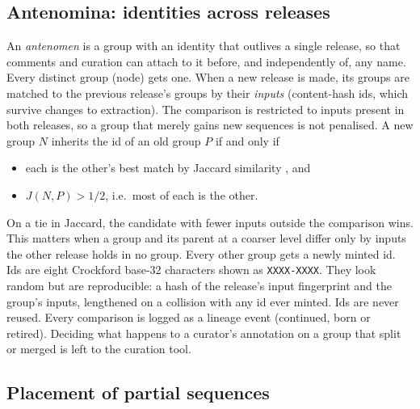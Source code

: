 \documentclass[11pt,a4paper]{article}
\begin{document}
\subsection{Antenomina: identities across releases}\label{sec:antenomina}

An \emph{antenomen} is a group with an identity that outlives a single release, so that comments
and curation can attach to it before, and independently of, any name. Every distinct group (node)
gets one. When a new release is made, its groups are matched to the previous release's groups by
their \emph{inputs} (content-hash ids, which survive changes to extraction). The comparison is
restricted to inputs present in both releases, so a group that merely gains new sequences is not
penalised. A new group $N$ inherits the id of an old group $P$ if and only if
\begin{itemize}
  \item each is the other's best match by Jaccard similarity \citep{jaccard1912}, and
  \item $J(N,P) > 1/2$, i.e.\ most of each is the other.
\end{itemize}
On a tie in Jaccard, the candidate with fewer inputs outside the comparison wins. This matters
when a group and its parent at a coarser level differ only by inputs the other release holds in no
group. Every other group gets a newly minted id. Ids are eight Crockford base-32 characters shown
as \texttt{XXXX-XXXX}. They look random but are reproducible: a hash of the release's input
fingerprint and the group's inputs, lengthened on a collision with any id ever minted. Ids are never
reused. Every comparison is logged as a lineage event (continued, born or retired). Deciding what
happens to a curator's annotation on a group that split or merged is left to the curation tool.

\subsection{Placement of partial sequences}\label{sec:placement}
\end{document}
